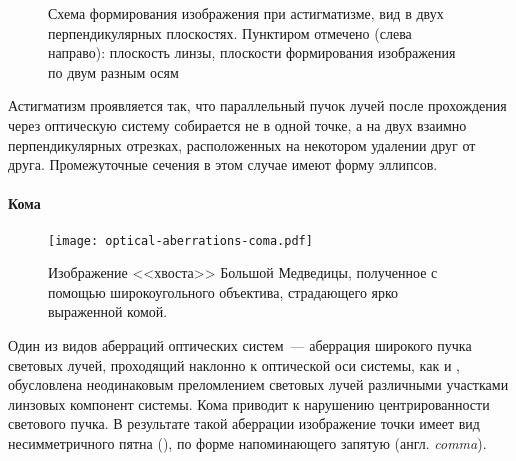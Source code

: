\begin{wrapfigure}[13]{r}{0.4\tw}
    \caption{Схема формирования изображения при астигматизме, вид в двух перпендикулярных плоскостях. Пунктиром отмечено (слева направо): плоскость линзы, плоскости формирования изображения по двум разным осям}
    \label{pic:astigmatism}
\end{wrapfigure}
Астигматизм проявляется так, что параллельный пучок лучей после прохождения через оптическую систему собирается не в одной точке, а на двух взаимно перпендикулярных отрезках, расположенных на некотором удалении друг от друга. Промежуточные сечения в этом случае имеют форму эллипсов.

\paragraph{Кома}

\begin{wrapfigure}[13]{l}{0.4\tw}
    \centering
    \vspace{-1pc}
    \texttt{[image: optical-aberrations-coma.pdf]}
    \caption{Изображение <<хвоста>> Большой Медведицы, полученное с помощью широкоугольного объектива, страдающего ярко выраженной комой.}
    \label{pic:optics-aberrations-coma}
\end{wrapfigure}
Один из видов аберраций оптических систем~--- аберрация широкого пучка световых лучей, проходящий наклонно к оптической оси системы, как и , обусловлена неодинаковым преломлением световых лучей различными участками линзовых компонент системы. Кома приводит к нарушению центрированности светового пучка. В результате такой аберрации изображение точки имеет вид несимметричного пятна (), по форме напоминающего запятую (англ. {\itshape comma}).

